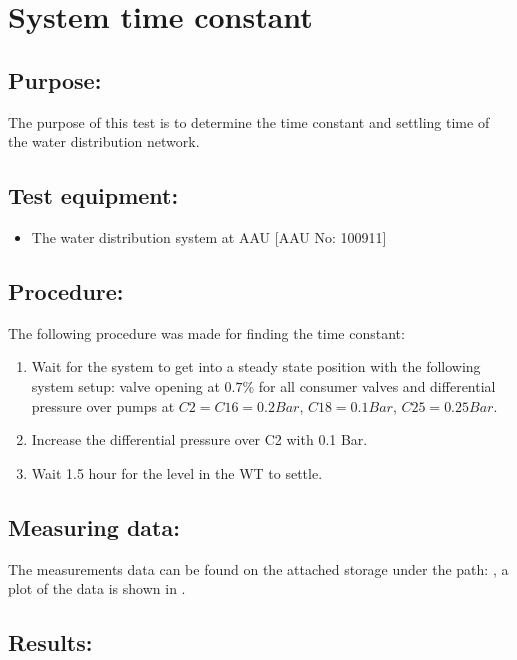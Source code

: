 \section{System time constant}
\label{sec:WT_TimeConstant}

\subsection*{Purpose:}
The purpose of this test is to determine the time constant and settling time of the water distribution network.


\subsection*{Test equipment:}
\begin{itemize}
\item The water distribution system at AAU [AAU No: 100911]
\end{itemize}

\subsection*{Procedure:}
The following procedure was made for finding the time constant:
\begin{enumerate}
\item Wait for the system to get into a steady state position with the following system setup: valve opening at $0.7 \%$ for all consumer valves and differential pressure over pumps at $C2 = C16 = 0.2 Bar$, $C18 = 0.1 Bar$, $C25 = 0.25 Bar$.
\item Increase the differential pressure over C2 with 0.1 Bar.
\item Wait 1.5 hour for the level in the WT to settle.
\end{enumerate}


\subsection*{Measuring data:}
The measurements data can be found on the attached storage under the path: , a plot of the data is shown in .

\subsection*{Results:}

